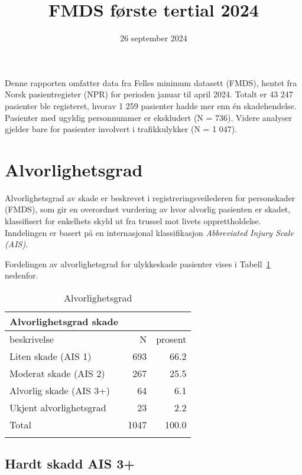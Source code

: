 \documentclass[
  letterpaper,
  DIV=11,
  numbers=noendperiod]{scrartcl}
\title{FMDS første tertial 2024}
\subtitle{26 september 2024}
\author{}
\date{}
\begin{document}
\maketitle


Denne rapporten omfatter data fra Felles minimum datasett (FMDS), hentet
fra Norsk pasientregister (NPR) for perioden januar til april 2024.
Totalt er 43 247 pasienter ble registeret, hvorav 1 259 pasienter hadde
mer enn én skadehendelse. Pasienter med ugyldig personnummer er
ekskludert (N = 736). Videre analyser gjelder bare for pasienter
involvert i trafikkulykker (N = 1 047).

\section{Alvorlighetsgrad}\label{alvorlighetsgrad}

Alvorlighetsgrad av skade er beskrevet i registreringsveilederen for
personskader (FMDS), som gir en overordnet vurdering av hvor alvorlig
pasienten er skadet, klassifisert for enkelhets skyld ut fra trussel mot
livets opprettholdelse. Inndelingen er basert på en internasjonal
klassifikasjon \emph{Abbreviated Injury Scale (AIS)}.

Fordelingen av alvorlighetsgrad for ulykkeskade pasienter vises i
Tabell~\ref{tbl-alvorlig} nedenfor.

\begingroup
\fontsize{12.0pt}{14.4pt}\selectfont

\begin{longtable}{lrr}


\caption*{
{\large Alvorlighetsgrad skade}
} \\ 
\toprule
beskrivelse & N & prosent \\ 
\midrule\addlinespace[2.5pt]
Liten skade (AIS 1) & 693 & 66.2 \\ 
Moderat skade (AIS 2) & 267 & 25.5 \\ 
Alvorlig skade (AIS 3+) & 64 & 6.1 \\ 
Ukjent alvorlighetsgrad & 23 & 2.2 \\ 
Total & 1047 & 100.0 \\ 
\bottomrule

\caption{\label{tbl-alvorlig}Alvorlighetsgrad}

\tabularnewline
\end{longtable}

\endgroup

\subsection{Hardt skadd AIS 3+}\label{hardt-skadd-ais-3}
\end{document}
